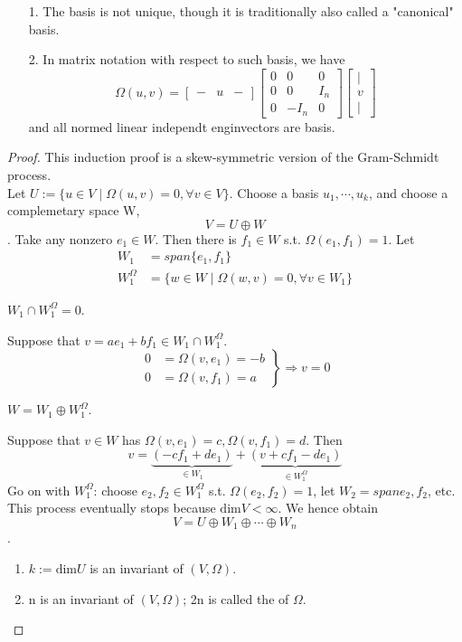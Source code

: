 \documentclass[4paper]{article}
\begin{document}
\begin{enumerate}
\item[1.] The basis is not unique, though it is traditionally also called a "canonical" basis.
\item[2.] In matrix notation with respect to such basis, we have 
\begin{equation*}
\Omega(u,v)=
\begin{bmatrix}
- & u & -
\end{bmatrix}
\begin{bmatrix}
0 & 0 & 0 \\
0 & 0 & I_n \\
0 &-I_n& 0
\end{bmatrix}
\begin{bmatrix}
| \\
v \\
|
\end{bmatrix}
\end{equation*}
and all normed linear independt enginvectors are basis. 
\end{enumerate}

\begin{proof}
This induction proof is a skew-symmetric version of the Gram-Schmidt process. \\ Let $U:=\{u\in V\mid 
\Omega(u,v)=0,\forall v\in V\}$. Choose a basis $u_1,\cdots,u_k$, and choose a complemetary space W,
$$V=U\oplus W$$. Take any nonzero $e_1\in W$. Then there is $f_1\in W$ s.t. $\Omega(e_1,f_1)=1$. Let
\begin{align*}
W_1 &= span\{e_1,f_1\} \\
W_1^{\Omega}&=\{w\in W\mid \Omega(w,v)=0,\forall v\in W_1\}
\end{align*}
\begin{claim}
$W_1\cap W_1^{\Omega}={0}$.
\end{claim}
Suppose that $v=ae_1+bf_1\in W_1\cap W_1^{\Omega}$.
\begin{equation*}
 \left.\begin{aligned}
        0&=\Omega(v,e_1)=-b\\
        0&=\Omega(v,f_1)=a
       \end{aligned}
 \right\}
 \Rightarrow v=0
\end{equation*}
\begin{claim}
$W=W_1\oplus W_1^\Omega$.
\end{claim}
Suppose that $v\in W$ has $\Omega(v,e_1)=c, \Omega(v,f_1)=d$. Then
\[
 v = \underbrace{(-cf_1+de_1)}_{\in W_1}
   + \underbrace{(v+cf_1-de_1)}_{\in W_1^\Omega}
\]
Go on with $W_1^\Omega$: choose $e_2,f_2\in W_1^\Omega$ s.t. $\Omega(e_2,f_2)=1$, let $W_2=span{e_2,f_2}$, etc.
This process eventually stops because $\text{dim}V<\infty$. We hence obtain $$V=U\oplus W_1\oplus \cdots \oplus W_n$$.
\begin{enumerate}
\item $k:=\text{dim}U$ is an invariant of $(V,\Omega)$.\\
\item n is an invariant of $(V,\Omega)$; 2n is called the  of $\Omega$.
\end{enumerate}
\end{proof}
\end{document}
